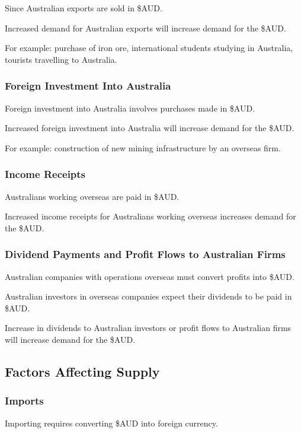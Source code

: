 \documentclass[a4paper,11pt]{article}
\begin{document}
Since Australian exports are sold in \$AUD.

Increased demand for Australian exports will increase demand for the \$AUD.

For example: purchase of iron ore, international students studying in Australia,
tourists travelling to Australia.


\subsubsection{Foreign Investment Into Australia}

Foreign investment into Australia involves purchases made in \$AUD.

Increased foreign investment into Australia will increase demand for the \$AUD.

For example: construction of new mining infrastructure by an overseas firm.


\subsubsection{Income Receipts}

Australians working overseas are paid in \$AUD.

Increased income receipts for Australians working overseas increases demand for
the \$AUD.


\subsubsection{Dividend Payments and Profit Flows to Australian Firms}

Australian companies with operations overseas must convert profits into \$AUD.

Australian investors in overseas companies expect their dividends to be paid
in \$AUD.

Increase in dividends to Australian investors or profit flows to Australian
firms will increase demand for the \$AUD.


\subsection{Factors Affecting Supply}

\subsubsection{Imports}

Importing requires converting \$AUD into foreign currency.
\end{document}
